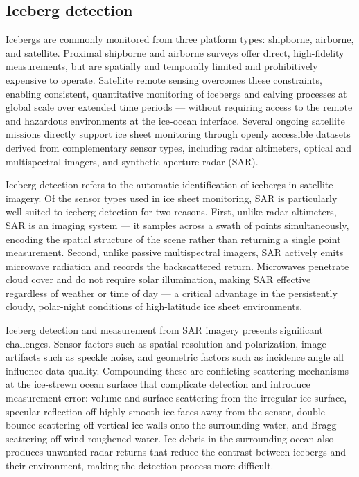 \documentclass[11pt, letterpaper]{article}
\begin{document}
\subsection{Iceberg detection}

Icebergs are commonly monitored from three platform types: shipborne, airborne, and satellite. Proximal shipborne and airborne surveys offer direct, high-fidelity measurements, but are spatially and temporally limited and prohibitively expensive to operate. Satellite remote sensing overcomes these constraints, enabling consistent, quantitative monitoring of icebergs and calving processes at global scale over extended time periods --- without requiring access to the remote and hazardous environments at the ice-ocean interface. Several ongoing satellite missions directly support ice sheet monitoring through openly accessible datasets derived from complementary sensor types, including radar altimeters, optical and multispectral imagers, and synthetic aperture radar (SAR).~\parencite{otosaka2023, koo2021, koo2023}

Iceberg detection refers to the automatic identification of icebergs in satellite imagery. Of the sensor types used in ice sheet monitoring, SAR is particularly well-suited to iceberg detection for two reasons. First, unlike radar altimeters, SAR is an imaging system --- it samples across a swath of points simultaneously, encoding the spatial structure of the scene rather than returning a single point measurement. Second, unlike passive multispectral imagers, SAR actively emits microwave radiation and records the backscattered return. Microwaves penetrate cloud cover and do not require solar illumination, making SAR effective regardless of weather or time of day --- a critical advantage in the persistently cloudy, polar-night conditions of high-latitude ice sheet environments.~\parencite{fisser2025, koo2021,  koo2023}

Iceberg detection and measurement from SAR imagery presents significant challenges. Sensor factors such as spatial resolution and polarization, image artifacts such as speckle noise, and geometric factors such as incidence angle all influence data quality. Compounding these are conflicting scattering mechanisms at the ice-strewn ocean surface that complicate detection and introduce measurement error: volume and surface scattering from the irregular ice surface, specular reflection off highly smooth ice faces away from the sensor, double-bounce scattering off vertical ice walls onto the surrounding water, and Bragg scattering off wind-roughened water. Ice debris in the surrounding ocean also produces unwanted radar returns that reduce the contrast between icebergs and their environment, making the detection process more difficult.~\parencite{fisser2025, koo2021, koo2023}
\end{document}
